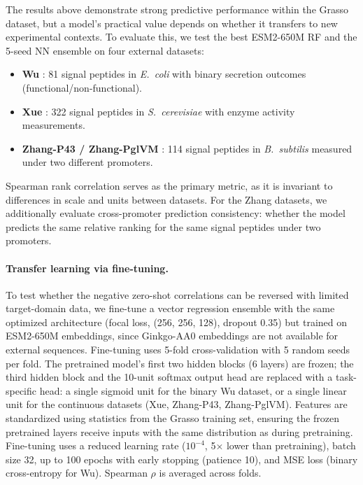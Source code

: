 \documentclass[12pt]{article}
\begin{document}
The results above demonstrate strong predictive performance within the Grasso dataset, but a model's practical value depends on whether it transfers to new experimental contexts.
To evaluate this, we test the best ESM2-650M RF and the 5-seed NN ensemble on four external datasets:
\begin{itemize}
    \item \textbf{Wu} \citep{wu2020}: 81 signal peptides in \textit{E.\ coli} with binary secretion outcomes (functional/non-functional).
    \item \textbf{Xue} \citep{xue2023}: 322 signal peptides in \textit{S.\ cerevisiae} with enzyme activity measurements.
    \item \textbf{Zhang-P43 / Zhang-PglVM} \citep{zhang2016}: 114 signal peptides in \textit{B.\ subtilis} measured under two different promoters.
\end{itemize}
Spearman rank correlation serves as the primary metric, as it is invariant to differences in scale and units between datasets.
For the Zhang datasets, we additionally evaluate cross-promoter prediction consistency: whether the model predicts the same relative ranking for the same signal peptides under two promoters.

\paragraph{Transfer learning via fine-tuning.}
To test whether the negative zero-shot correlations can be reversed with limited target-domain data,
we fine-tune a vector regression ensemble with the same optimized architecture
(focal loss, (256, 256, 128), dropout 0.35) but trained on ESM2-650M embeddings,
since Ginkgo-AA0 embeddings are not available for external sequences.
Fine-tuning uses 5-fold cross-validation with 5 random seeds per fold.
The pretrained model's first two hidden blocks (6 layers) are frozen; the third hidden block and the 10-unit softmax
output head are replaced with a task-specific head: a single sigmoid unit for the binary Wu dataset,
or a single linear unit for the continuous datasets (Xue, Zhang-P43, Zhang-PglVM).
Features are standardized using statistics from the Grasso training set, ensuring the frozen pretrained layers receive inputs with the same distribution as during pretraining.
Fine-tuning uses a reduced learning rate ($10^{-4}$, 5$\times$ lower than pretraining),
batch size 32, up to 100 epochs with early stopping (patience 10), and MSE loss
(binary cross-entropy for Wu). Spearman $\rho$ is averaged across folds.
\end{document}
